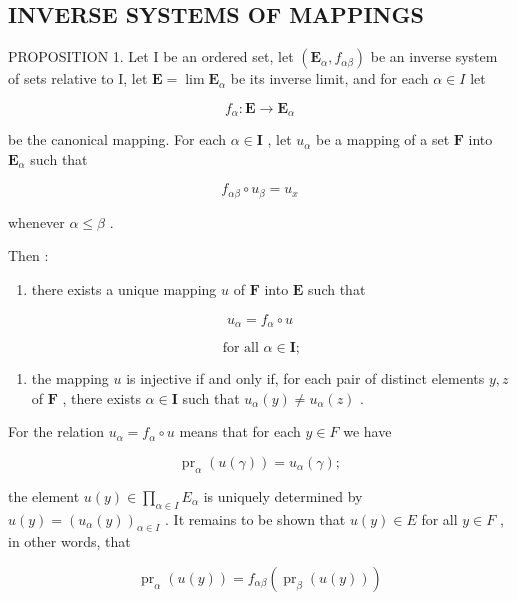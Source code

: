 \subsection{INVERSE SYSTEMS OF MAPPINGS}

PROPOSITION 1. Let I be an ordered set, let \((\mathbf{E}_{\alpha}, f_{\alpha \beta})\) be an inverse system of sets relative to I, let \(\mathbf{E} = \lim \mathbf{E}_{\alpha}\) be its inverse limit, and for each \(\alpha \in I\) let

\[
f _ {\alpha}: \mathbf {E} \rightarrow \mathbf {E} _ {\alpha}
\]

be the canonical mapping. For each \(\alpha \in \mathbf{I}\) , let \(u_{\alpha}\) be a mapping of a set \(\mathbf{F}\) into \(\mathbf{E}_{\alpha}\) such that

\[
f _ {\alpha \beta} \circ u _ {\beta} = u _ {x}\tag{5}
\]

whenever \(\alpha \leqslant \beta\) .

Then :

\begin{enumerate}
\def\labelenumi{(\alph{enumi})}
\tightlist
\item
  there exists a unique mapping \(u\) of \(\mathbf{F}\) into \(\mathbf{E}\) such that
\end{enumerate}

\[
u _ {\alpha} = f _ {\alpha} \circ u\tag{6}
\]

\[
\text { for   all } \alpha \in \mathbf {I};
\]

\begin{enumerate}
\def\labelenumi{(\alph{enumi})}
\setcounter{enumi}{1}
\tightlist
\item
  the mapping \(u\) is injective if and only if, for each pair of distinct elements \(y, z\) of \(\mathbf{F}\) , there exists \(\alpha \in \mathbf{I}\) such that \(u_{\alpha}(y) \neq u_{\alpha}(z)\) .
\end{enumerate}

For the relation \(u_{\alpha} = f_{\alpha} \circ u\) means that for each \(y \in F\) we have

\[
\operatorname{pr} _ {\alpha} (u (\gamma)) = u _ {\alpha} (\gamma);
\]

the element \(u(y) \in \prod_{\alpha \in I} E_{\alpha}\) is uniquely determined by \(u(y) = (u_{\alpha}(y))_{\alpha \in I}\) . It remains to be shown that \(u(y) \in E\) for all \(y \in F\) , in other words, that

\[
\operatorname{pr} _ {\alpha} (u (y)) = f _ {\alpha \beta} (\operatorname{pr} _ {\beta} (u (y)))
\]

